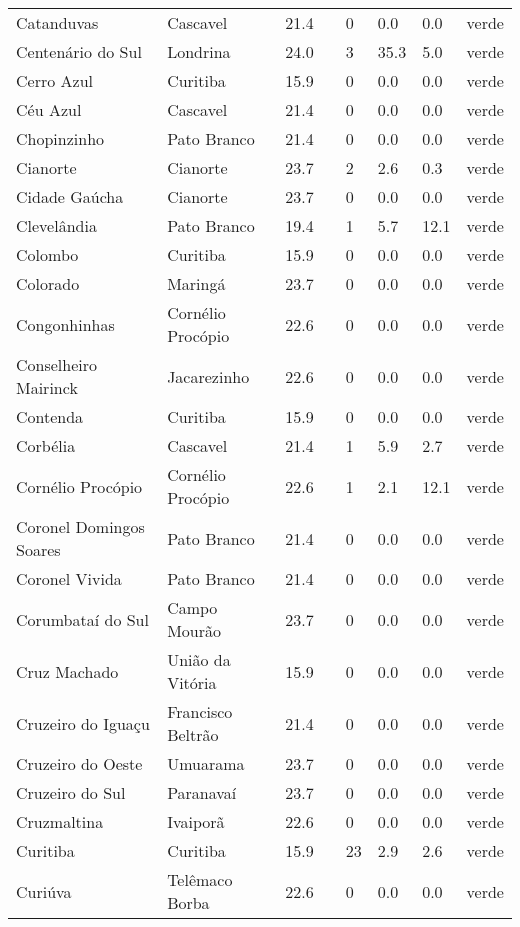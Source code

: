 \begin{longtable}{l|lllllll}
  Catanduvas & Cascavel & 21.4 &  & 0 & 0.0 & 0.0 & verde \\ 
  Centenário do Sul & Londrina & 24.0 &  & 3 & 35.3 & 5.0 & verde \\ 
  Cerro Azul & Curitiba & 15.9 &  & 0 & 0.0 & 0.0 & verde \\ 
  Céu Azul & Cascavel & 21.4 &  & 0 & 0.0 & 0.0 & verde \\ 
  Chopinzinho & Pato Branco & 21.4 &  & 0 & 0.0 & 0.0 & verde \\ 
  Cianorte & Cianorte & 23.7 &  & 2 & 2.6 & 0.3 & verde \\ 
  Cidade Gaúcha & Cianorte & 23.7 &  & 0 & 0.0 & 0.0 & verde \\ 
  Clevelândia & Pato Branco & 19.4 &  & 1 & 5.7 & 12.1 & verde \\ 
  Colombo & Curitiba & 15.9 &  & 0 & 0.0 & 0.0 & verde \\ 
  Colorado & Maringá & 23.7 &  & 0 & 0.0 & 0.0 & verde \\ 
  Congonhinhas & Cornélio Procópio & 22.6 &  & 0 & 0.0 & 0.0 & verde \\ 
  Conselheiro Mairinck & Jacarezinho & 22.6 &  & 0 & 0.0 & 0.0 & verde \\ 
  Contenda & Curitiba & 15.9 &  & 0 & 0.0 & 0.0 & verde \\ 
  Corbélia & Cascavel & 21.4 &  & 1 & 5.9 & 2.7 & verde \\ 
  Cornélio Procópio & Cornélio Procópio & 22.6 &  & 1 & 2.1 & 12.1 & verde \\ 
  Coronel Domingos Soares & Pato Branco & 21.4 &  & 0 & 0.0 & 0.0 & verde \\ 
  Coronel Vivida & Pato Branco & 21.4 &  & 0 & 0.0 & 0.0 & verde \\ 
  Corumbataí do Sul & Campo Mourão & 23.7 &  & 0 & 0.0 & 0.0 & verde \\ 
  Cruz Machado & União da Vitória & 15.9 &  & 0 & 0.0 & 0.0 & verde \\ 
  Cruzeiro do Iguaçu & Francisco Beltrão & 21.4 &  & 0 & 0.0 & 0.0 & verde \\ 
  Cruzeiro do Oeste & Umuarama & 23.7 &  & 0 & 0.0 & 0.0 & verde \\ 
  Cruzeiro do Sul & Paranavaí & 23.7 &  & 0 & 0.0 & 0.0 & verde \\ 
  Cruzmaltina & Ivaiporã & 22.6 &  & 0 & 0.0 & 0.0 & verde \\ 
  Curitiba & Curitiba & 15.9 &  & 23 & 2.9 & 2.6 & verde \\ 
  Curiúva & Telêmaco Borba & 22.6 &  & 0 & 0.0 & 0.0 & verde \\ 

\end{longtable}
